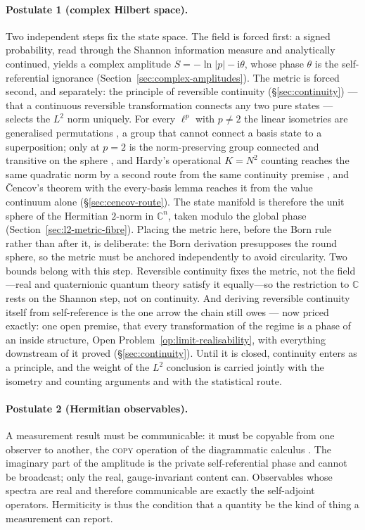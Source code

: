 \paragraph{Postulate 1 (complex Hilbert space).} Two independent steps fix the state space. The
field is forced first: a signed probability, read through the Shannon information measure and
analytically continued, yields a complex amplitude $S=-\ln\lvert p\rvert-\mathrm{i}\theta$,
whose phase $\theta$ is the self-referential ignorance (Section~\ref{sec:complex-amplitudes}).
The metric is forced second, and separately: the principle of reversible continuity
(\S\ref{sec:continuity}) --- that a continuous reversible transformation connects any two pure
states --- selects the $L^{2}$ norm uniquely. For every $\ell^{p}$ with $p\neq 2$ the linear
isometries are generalised permutations \autocite{Banach1932, Lamperti1958}, a group that cannot
connect a basis state to a superposition; only at $p=2$ is the norm-preserving group connected
and transitive on the sphere \autocite{Aaronson2004h}, and Hardy's operational $K=N^{2}$
counting reaches the same quadratic norm by a second route from the same continuity premise
\autocite{Hardy2001a}, and \v{C}encov's theorem with the every-basis lemma reaches it from the
value continuum alone (\S\ref{sec:cencov-route}). The state manifold is therefore the unit
sphere of the Hermitian $2$-norm in $\mathbb{C}^{n}$, taken modulo the global phase
(Section~\ref{sec:l2-metric-fibre}). Placing the metric here, before the Born rule rather than
after it, is deliberate: the Born derivation presupposes the round sphere, so the metric must be
anchored independently to avoid circularity. Two bounds belong with this step. Reversible
continuity fixes the metric, not the field---real and quaternionic quantum theory satisfy it
equally---so the restriction to $\mathbb{C}$ rests on the Shannon step, not on continuity. And
deriving reversible continuity itself from self-reference is the one arrow the chain still owes
--- now priced exactly: one open premise, that every transformation of the regime is a phase of an inside structure,
Open Problem~\ref{op:limit-realisability}, with everything downstream of it proved
(\S\ref{sec:continuity}). Until it is closed, continuity enters as a principle, and the weight
of the $L^{2}$ conclusion is carried jointly with the isometry and counting arguments and with
the statistical route.

\paragraph{Postulate 2 (Hermitian observables).}
A measurement result must be communicable: it must be copyable from one observer
to another, the \textsc{copy} operation of the diagrammatic calculus
\autocite{CoeckeKissinger2017}. The imaginary part of the amplitude is the
private self-referential phase and cannot be broadcast; only the real,
gauge-invariant content can. Observables whose spectra are real and therefore
communicable are exactly the self-adjoint operators. Hermiticity is thus the
condition that a quantity be the kind of thing a measurement can report.

